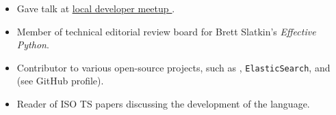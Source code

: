 \documentclass{mycv}
\begin{document}
\begin{itemize}
  \item Gave talk at \href{https://fullstacktc.org/user/ashermancinelli}{ \underline{ local developer meetup } }. 
  \item Member of technical editorial review board for Brett Slatkin's \textit{Effective Python}. 
  \item Contributor to various open-source projects, such as \pyt, \texttt{ElasticSearch}, and \hiop (see GitHub profile).
  \item Reader of ISO \cpp TS papers discussing the development of the language.
\end{itemize}
\end{document}
